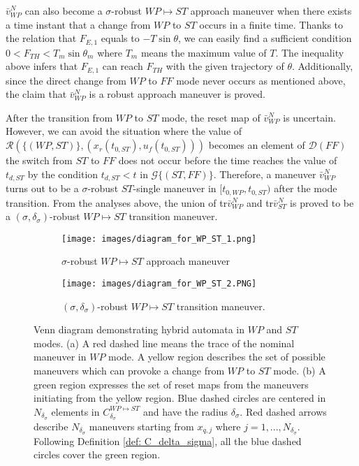 \documentclass[letterpaper, 10 pt, conference]{ieeeconf}  %
\theoremstyle{definition}
\begin{document}
$\bar{v}^N_{WP}$ can also become a $\sigma$-robust $WP \mapsto ST$ approach maneuver when there exists a time instant that a change from $WP$ to $ST$ occurs in a finite time. Thanks to the relation that $F_{E,1}$ equals to $-T\sin\theta$, we can easily find a sufficient condition $0 < F_{TH} < T_{m}\sin \theta_m$ where $T_{m}$ means the maximum value of $T$. The inequality above infers that $F_{E, 1}$ can reach $F_{T H}$ with the given trajectory of $\theta$. {Additionally, since the direct change from $WP$ to $FF$ mode never occurs as mentioned above}, the claim that $\bar{v}^N_{WP}$ is a robust approach maneuver is proved.

After the transition from $WP$ to $ST$ mode, the reset map of $\bar{v}^N_{WP}$ is uncertain. However, we can avoid the situation where the value of $\mathcal{R}(\{ (WP, ST) \}, (x_r(t_{0, ST}), u_f(t_{0, ST})))$ becomes an element of $\mathcal{D}(FF)$ the switch from $ST$ to $FF$ does not occur before the time reaches the value of $t_{d, ST}$ by the condition $t_{d, ST} < t$ in $\mathcal{G}\{ (ST, FF) \}$. Therefore, a maneuver $\bar{v}^N_{WP}$ turns out to be a $\sigma$-robust $ST$-single maneuver in $[t_{0, WP}, t_{0, ST})$ after the mode transition. From the analyses above, the union of tr$\bar{v}^N_{W P}$ and tr$\bar{v}^N_{ST}$ is proved to be a $(\sigma, \delta_{\sigma})$-robust $WP \mapsto ST$ transition maneuver.
\begin{figure}[t] \centering
\begin{subfigure}{0.45\textwidth} \centering
\texttt{[image: images/diagram\_for\_WP\_ST\_1.png]} 
\caption{$\sigma$-robust $WP \mapsto ST$ approach maneuver}
\label{fig:diagram_for_WP_ST_1}
\end{subfigure}
\begin{subfigure}{0.45\textwidth} \centering
\texttt{[image: images/diagram\_for\_WP\_ST\_2.PNG]}
\caption{$(\sigma, \delta_{\sigma})$-robust $WP \mapsto ST$ transition maneuver.}
\label{fig:diagram_for_WP_ST_2}
\end{subfigure}
\caption{Venn diagram demonstrating hybrid automata in $WP$ and $ST$ modes. (a) A red dashed line means the trace of the nominal maneuver in $WP$ mode. A yellow region describes the set of possible maneuvers which can provoke a change from $WP$ to $ST$ mode. (b) A green region expresses the set of reset maps from the maneuvers initiating from the yellow region. Blue dashed circles are centered in $N_{\delta_{\sigma}}$ elements in $C^{WP \mapsto ST}_{\delta_{\sigma}}$ and have the radius $\delta_{\sigma}$. Red dashed arrows describe $N_{\delta_{\sigma}}$ maneuvers starting from $x_{q, j}$ where $j = 1, ..., N_{\delta_{\sigma}}$. Following Definition \ref{def: C_delta_sigma}, all the blue dashed circles cover the green region.}
\label{fig:diagram_for_WP_ST}
\vspace{-0.5cm}
\end{figure}
\end{document}
